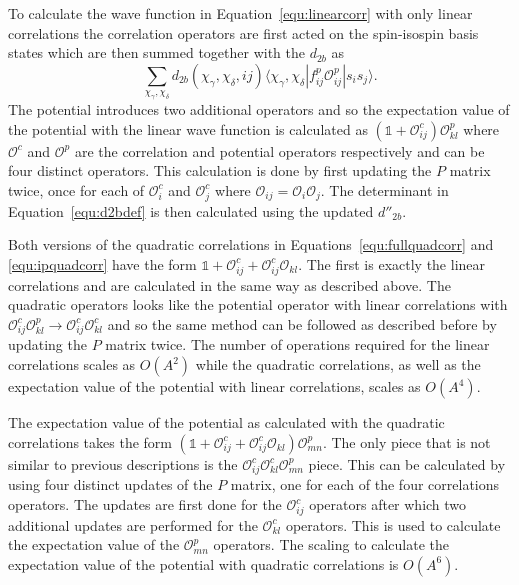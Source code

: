 To calculate the wave function in Equation~\ref{equ:linearcorr} with only linear correlations the correlation operators are first acted on the spin-isospin basis states which are then summed together with the $d_{2b}$ as
\begin{equation}
   \sum\limits_{\chi_\gamma,\chi_\delta}d_{2b}(\chi_\gamma,\chi_\delta,ij)\langle\chi_\gamma,\chi_\delta|f_{ij}^p\mathcal{O}_{ij}^p|s_i s_j\rangle.
\end{equation}
The potential introduces two additional operators and so the expectation value of the potential with the linear wave function is calculated as $(\mathbb{1}+\mathcal{O}^c_{ij})\mathcal{O}^p_{kl}$ where $\mathcal{O}^c$ and $\mathcal{O}^p$ are the correlation and potential operators respectively and can be four distinct operators. This calculation is done by first updating the $P$ matrix twice, once for each of $\mathcal{O}^c_i$ and $\mathcal{O}^c_j$ where $\mathcal{O}_{ij}=\mathcal{O}_i\mathcal{O}_j$. The determinant in Equation~\ref{equ:d2bdef} is then calculated using the updated $d''_{2b}$.

Both versions of the quadratic correlations in Equations~\ref{equ:fullquadcorr} and \ref{equ:ipquadcorr} have the form $\mathbb{1} + \mathcal{O}^c_{ij} + \mathcal{O}^c_{ij}\mathcal{O}_{kl}$. The first is exactly the linear correlations and are calculated in the same way as described above. The quadratic operators looks like the potential operator with linear correlations with $\mathcal{O}^c_{ij}\mathcal{O}^p_{kl} \rightarrow \mathcal{O}^c_{ij}\mathcal{O}^c_{kl}$ and so the same method can be followed as described before by updating the $P$ matrix twice. The number of operations required for the linear correlations scales as $O(A^2)$ while the quadratic correlations, as well as the expectation value of the potential with linear correlations, scales as $O(A^4)$.

The expectation value of the potential as calculated with the quadratic correlations takes the form $\left(\mathbb{1} + \mathcal{O}^c_{ij} + \mathcal{O}^c_{ij}\mathcal{O}_{kl}\right)\mathcal{O}^p_{mn}$. The only piece that is not similar to previous descriptions is the $\mathcal{O}^c_{ij}\mathcal{O}^c_{kl}\mathcal{O}^p_{mn}$ piece. This can be calculated by using four distinct updates of the $P$ matrix, one for each of the four correlations operators. The updates are first done for the $\mathcal{O}^c_{ij}$ operators after which two additional updates are performed for the $\mathcal{O}^c_{kl}$ operators. This is used to calculate the expectation value of the $\mathcal{O}^p_{mn}$ operators. The scaling to calculate the expectation value of the potential with quadratic correlations is $O(A^6)$.

